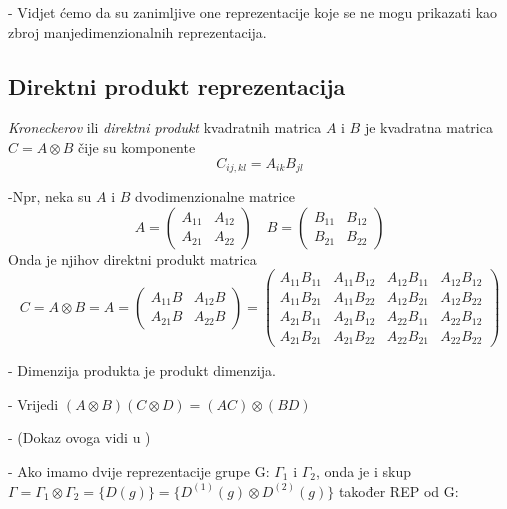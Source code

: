- Vidjet ćemo da su zanimljive one reprezentacije koje se ne mogu
  prikazati kao zbroj manjedimenzionalnih reprezentacija.

\subsection*{Direktni produkt reprezentacija}

\emph{Kroneckerov} ili \emph{direktni produkt} kvadratnih matrica 
$A$ i $B$ je kvadratna matrica $C=A\otimes B$ čije su komponente
\begin{displaymath}
          C_{ij,kl}=A_{ik}B_{jl}
\end{displaymath}

-Npr, neka su $A$ i $B$ dvodimenzionalne matrice
\begin{displaymath}
A=\left( \begin{array}{cc}
    A_{11} & A_{12} \\
    A_{21} & A_{22}
\end{array} \right) \quad
B=\left( \begin{array}{cc}
    B_{11} & B_{12} \\
    B_{21} & B_{22}
\end{array}\right)  
\end{displaymath}
Onda je njihov direktni produkt matrica
\begin{displaymath}
C=A\otimes B= 
A=\left( \begin{array}{cc}
    A_{11} B & A_{12} B \\
    A_{21} B & A_{22} B
\end{array} \right) =
\left(
\begin{array}{cccc}
  A_{11}B_{11} & A_{11}B_{12} & A_{12}B_{11} & A_{12}B_{12} \\
  A_{11}B_{21} & A_{11}B_{22} & A_{12}B_{21} & A_{12}B_{22} \\
  A_{21}B_{11} & A_{21}B_{12} & A_{22}B_{11} & A_{22}B_{12} \\
  A_{21}B_{21} & A_{21}B_{22} & A_{22}B_{21} & A_{22}B_{22} 
\end{array} \right)
\end{displaymath}

- Dimenzija produkta je produkt dimenzija.

- Vrijedi $(A\otimes B)(C\otimes D)=(AC)\otimes(BD)$

- (Dokaz ovoga vidi u \cite{Jones:1998})

- Ako imamo dvije reprezentacije grupe G: $\Gamma_1$ i $\Gamma_2$,
onda je i skup $\Gamma=\Gamma_1 \otimes \Gamma_2 = \{D(g)\}=
\{D^{(1)}(g)\otimes D^{(2)}(g)\}$ također REP od G:

